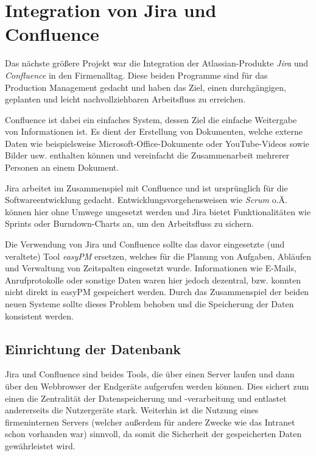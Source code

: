 \documentclass[xcolor=dvipsnames,11pt,paper=a4paper]{report}
\begin{document}
\chapter{Integration von Jira und Confluence}
\label{ch:jira}

Das nächste größere Projekt war die Integration der Atlassian-Produkte \textit{Jira}
und \textit{Confluence} in den Firmenalltag. Diese beiden Programme sind für das
Production Management gedacht und haben das Ziel, einen durchgängigen, geplanten
und leicht nachvollziehbaren Arbeitsfluss zu erreichen.

Confluence ist dabei ein einfaches System, dessen Ziel die einfache Weitergabe von
Informationen ist. Es dient der Erstellung von Dokumenten, welche externe Daten
wie beispielsweise Microsoft-Office-Dokumente oder YouTube-Videos sowie Bilder usw.
enthalten können und vereinfacht die Zusammenarbeit mehrerer Personen an einem Dokument.

Jira arbeitet im Zusammenspiel mit Confluence und ist ursprünglich für die Softwareentwicklung
gedacht. Entwicklungsvorgehensweisen wie \textit{Scrum} o.Ä. können hier ohne Umwege
umgesetzt werden und Jira bietet Funktionalitäten wie Sprints oder Burndown-Charts
an, um den Arbeitsfluss zu sichern.

Die Verwendung von Jira und Confluence sollte das davor eingesetzte (und veraltete)
Tool \textit{easyPM} ersetzen, welches für die Planung von Aufgaben, Abläufen und
Verwaltung von Zeitspalten eingesetzt wurde. Informationen wie E-Mails, Anrufprotokolle
oder sonstige Daten waren hier jedoch dezentral, bzw. konnten nicht direkt in easyPM
gespeichert werden. Durch das Zusammenspiel der beiden neuen Systeme sollte dieses
Problem behoben und die Speicherung der Daten konsistent werden.



\section{Einrichtung der Datenbank}
\label{sec:jira-einrichtung-datenbank}

Jira und Confluence sind beides Tools, die über einen Server laufen und dann über
den Webbrowser der Endgeräte aufgerufen werden können. Dies sichert zum einen die
Zentralität der Datenspeicherung und -verarbeitung und entlastet andererseits die
Nutzergeräte stark. Weiterhin ist die Nutzung eines firmeninternen Servers (welcher
außerdem für andere Zwecke wie das Intranet schon vorhanden war) sinnvoll, da somit
die Sicherheit der gespeicherten Daten gewährleistet wird.
\end{document}
